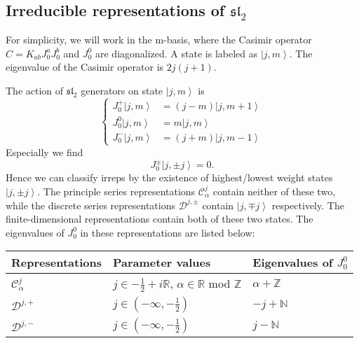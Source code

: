 \documentclass[10pt,a4paper]{article}
\numberwithin{equation}{section}
\newcommand{\ket}[1]{\left| #1 \right\rangle}
\begin{document}
\subsection{Irreducible representations of \texorpdfstring{$\mathfrak{sl}_{2}$}{Lg}}
For simplicity, we will work in the m-basis, where the Casimir operator $C=K_{ab}J^{a}_{0}J^{b}_{0}$ and $J^{0}_{0}$ are diagonalized. 
A state is labeled as $\ket{j,m}$. The eigenvalue of the Casimir operator is $2j(j+1)$.\\
\par The action of $\mathfrak{sl}_{2}$ generators on state $\ket{j,m}$ is 
\begin{equation}
    \left\{
        \begin{aligned}
            J^{+}_{0} \ket{j,m} & = (j-m) \ket{j,m+1}\\
            J^{0}_{0} \ket{j,m} & = m \ket{j,m}\\
            J^{-}_{0} \ket{j,m} & = (j+m) \ket{j,m-1}
        \end{aligned}
    \right.
\end{equation}
Especially we find 
\begin{equation}
    J^{\pm}_{0} \ket{j,\pm j} = 0.
\end{equation}
Hence we can classify irreps by the existence of highest/lowest weight states $\ket{j,\pm j}$\cite{Ribault:2014hia}. The principle series representations
$\mathcal{C}^{j}_{\alpha}$ contain neither of these two, while the discrete series representations $\mathcal{D}^{j,\pm}$ contain
$\ket{j,\mp j}$ respectively. The finite-dimensional representations contain both of these two states. The eigenvalues of $J^{0}_{0}$ in these 
representations are listed below:

\begin{center}
    \begin{tabular}{|l|l|l|}
        \hline
        Representations&Parameter values&Eigenvalues of $J^{0}_{0}$\\
        \hline
        $\mathcal{C}^{j}_{\alpha}$ & $j \in -\frac{1}{2} + i \mathbb{R} $, $\alpha \in \mathbb{R}$ mod $\mathbb{Z}$& $\alpha + \mathbb{Z}$\\
        $\mathcal{D}^{j,+}$ & $j \in (-\infty,-\frac{1}{2}) $& $-j + \mathbb{N}$\\
        $\mathcal{D}^{j,-}$ & $j \in (-\infty,-\frac{1}{2}) $& $j - \mathbb{N}$\\
        \hline
    \end{tabular}
\end{center}
\end{document}
